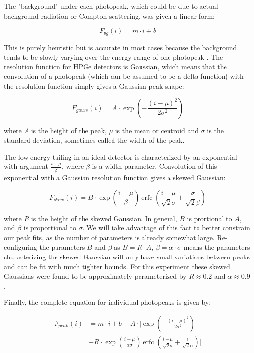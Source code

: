 \documentclass[aps,twocolumn,secnumarabic,balancelastpage,amsmath,amssymb,nofootinbib,floatfix]{revtex4-1}
\DeclareMathOperator\erfc{erfc}
\begin{document}
The "background" under each photopeak, which could be due to actual background radiation or Compton scattering, was given a linear form:

\begin{equation}
F_{bg}(i) = m\cdot i + b
\label{eq:background}
\end{equation}

This is purely heuristic but is accurate in most cases because the background tends to be slowly varying over the energy range of one photopeak \cite{gammas}.  The resolution function for HPGe detectors is Gaussian, which means that the convolution of a photopeak (which can be assumed to be a delta function) with the resolution function simply gives a Gaussian peak shape:

\begin{equation}
F_{gauss}(i) = A\cdot \exp (-\frac{(i-\mu)^2}{2\sigma^2})
\label{eq:gaussian}
\end{equation}

where $A$ is the height of the peak, $\mu$ is the mean or centroid and $\sigma$ is the standard deviation, sometimes called the width of the peak.

The low energy tailing in an ideal detector is characterized by an exponential with argument $\frac{i-\mu}{\beta}$, where $\beta$ is a width parameter.  Convolution of this exponential with a Gaussian resolution function gives a skewed Gaussian:

\begin{equation}
F_{skew}(i) = B\cdot \exp (\frac{i-\mu}{\beta}) \erfc (\frac{i-\mu}{\sqrt{2}\sigma}+\frac{\sigma}{\sqrt{2}\beta})
\label{eq:skew}
\end{equation}

where $B$ is the height of the skewed Gaussian.  In general, $B$ is prortional to $A$, and $\beta$ is proportional to $\sigma$.  We will take advantage of this fact to better constrain our peak fits, as the number of parameters is already somewhat large.  Re-configuring the parameters $B$ and $\beta$ as $B = R\cdot A$, $\beta = \alpha \cdot \sigma$ means the parameters characterizing the skewed Gaussian will only have small variations between peaks and can be fit with much tighter bounds.  For this experiment these skewed Gaussians were found to be approximately parameterized by $R \approx 0.2$ and $\alpha \approx 0.9$.

Finally, the complete equation for individual photopeaks is given by:

\begin{align*}
F_{peak}(i) &= m\cdot i + b + A\cdot [\exp (-\frac{(i-\mu)^2}{2\sigma^2}) \\
& + R\cdot \exp (\frac{i-\mu}{\alpha \sigma}) \erfc (\frac{i-\mu}{\sqrt{2}\sigma}+\frac{1}{\sqrt{2}\alpha})]
\label{eq:peak}
\end{align*}
\end{document}
